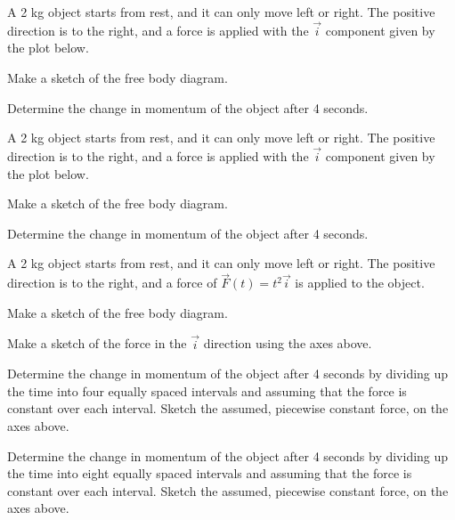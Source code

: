 \begin{problem}
\item A 2 kg object starts from rest, and it can only move left or
  right. The positive direction is to the right, and a force is
  applied with the  $\vec{i}$ component given by the plot below.

  \scalebox{0.5}{}

  \begin{subproblem}
    \item Make a sketch of the free body diagram.
      \vspace{4em}
    \item Determine the change in momentum of the object after 4
      seconds.
      \vfill
  \end{subproblem}
  \clearpage

\item A 2 kg object starts from rest, and it can only move left or
  right. The positive direction is to the right, and a force is
  applied with the  $\vec{i}$ component given by the plot below.

  \scalebox{0.5}{}

  \begin{subproblem}
    \item Make a sketch of the free body diagram.
      \vspace{4em}
    \item Determine the change in momentum of the object after 4
      seconds.
      \vfill
  \end{subproblem}
  \clearpage

\item A 2 kg object starts from rest, and it can only move left or
  right. The positive direction is to the right, and a force of
  $\vec{F}(t)=t^2 \vec{i}$ is applied to the object.

  \scalebox{0.5}{}

  \begin{subproblem}
    \item Make a sketch of the free body diagram.
      \vspace{4em}
    \item Make a sketch of the force in the $\vec{i}$ direction using
      the axes above.
    \item Determine the change in momentum of the object after 4
      seconds by dividing up the time into four equally spaced
      intervals and assuming that the force is constant over each
      interval. Sketch the assumed, piecewise constant force, on the
      axes above.
      \vfill
    \item Determine the change in momentum of the object after 4
      seconds by dividing up the time into eight equally spaced
      intervals and assuming that the force is constant over each
      interval. Sketch the assumed, piecewise constant force, on the
      axes above.
      \vfill
  \end{subproblem}
  \clearpage

\end{problem}

